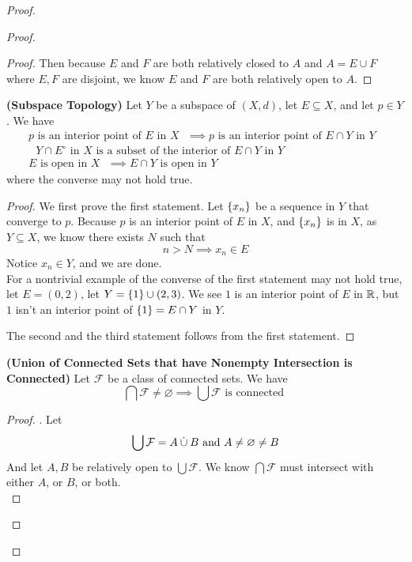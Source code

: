 \documentclass{report}
\begin{document}
\begin{proof}
\begin{proof}
\begin{proof}
Then because $E$ and  $F$ are both relatively closed to  $A$ and  $A=E\cup F$ where $E,F$ are disjoint, we know  $E$ and  $F$ are both relatively open to  $A$.
\end{proof}
\begin{theorem}
\label{3.3.2}
\textbf{(Subspace Topology)} Let $Y$ be a subspace of $(X,d)$, let $E\subseteq X$, and let $p\in  Y$. We have
\begin{gather}
p\text{ is an interior point of $E$ in $X$ }\implies p\text{ is an interior point of $E\cap Y$ in $Y$ } \\
\text{ $Y\cap E^\circ $ in $X$ is a subset of the interior of $E\cap Y$ in $Y$ }\\
E\text{ is open in $X$ }\implies E\cap Y\text{ is open in $Y$ }
\end{gather}
where the converse may not hold true.
\end{theorem}
\begin{proof}
We first prove the first statement. Let $\{ x_n \}$ be a sequence in $Y$ that converge to $p$. Because  $p$ is an interior point of  $E$ in  $X$, and  $\{ x_n \}$ is in $X$, as  $Y\subseteq X$, we know there exists $N$ such that 
 \begin{equation}
n>N\implies x_n\in E
\end{equation}
Notice $x_n\in Y$, and we are done.\\

For a nontrivial example of the converse of the first statement may not hold true, let $E=(0,2)$, let $Y=\{ 1 \}\cup (2,3)$. We see $1$ is an interior point of  $E$ in  $\mathbb{R}$, but  $1$ isn't an interior point of  $\{ 1 \}=E\cap Y$ in $Y$.

The second and the third statement follows from the first statement. 
\end{proof}
\begin{theorem}
\label{3.3.3}
\textbf{(Union of Connected Sets that have Nonempty Intersection is Connected)} Let $\mathcal{F}$ be a class of connected sets. We have 
\begin{equation}
\bigcap \mathcal{F}\neq \varnothing \implies \bigcup \mathcal{F}\text{ is connected }
\end{equation}
\end{theorem}
\begin{proof}
. Let 
\begin{equation}
\bigcup  \mathcal{F}= A \mathbin{\dot{\cup}} B\text{ and }A\neq \varnothing\neq B
\end{equation}
And let $A,B$ be relatively open to  $\bigcup \mathcal{F}$. We know $\bigcap \mathcal{F}$ must intersect with either $A$, or  $B$, or both.\\


\end{proof}
\end{proof}
\end{proof}
\end{document}
